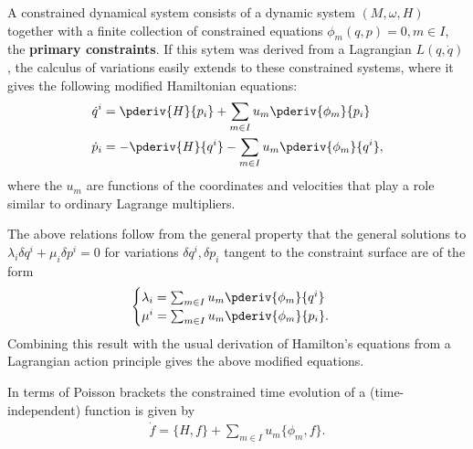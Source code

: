     A constrained dynamical system consists of a dynamic system $(M,\omega,H)$ together with a finite collection of constrained equations $\phi_m(q,p)=0,m\in I$, the \textbf{primary constraints}. If this sytem was derived from a Lagrangian $L(q,\dot{q})$, the calculus of variations easily extends to these constrained systems, where it gives the following modified Hamiltonian equations:
    \begin{align}
        \dot{q}^i &= \pderiv{H}{p_i} + \sum_{m\in I}u_m\pderiv{\phi_m}{p_i}\\
        \dot{p}_i &= -\pderiv{H}{q^i} - \sum_{m\in I}u_m\pderiv{\phi_m}{q^i},
    \end{align}
    where the $u_m$ are functions of the coordinates and velocities that play a role similar to ordinary Lagrange multipliers.
    \begin{remark}
        The above relations follow from the general property that the general solutions to $\lambda_i\delta q^i + \mu_i\delta p^i = 0$ for variations $\delta q^i,\delta p_i$ tangent to the constraint surface are of the form
        \begin{gather}
            \begin{cases}
                \lambda_i = \sum_{m\in I}u_m\pderiv{\phi_m}{q^i}&\\
                \mu^i = \sum_{m\in I}u_m\pderiv{\phi_m}{p_i}.&
            \end{cases}
        \end{gather}
        Combining this result with the usual derivation of Hamilton's equations from a Lagrangian action principle gives the above modified equations.
    \end{remark}
    In terms of Poisson brackets the constrained time evolution of a (time-independent) function is given by
    \begin{gather}
        \label{constraint:modified_poisson_evolution}
        \dot{f} = \{H,f\} + \sum_{m\in I}u_m\{\phi_m,f\}.
    \end{gather}

